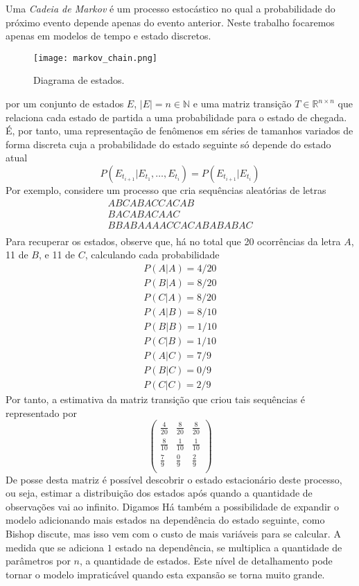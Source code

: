 \documentclass{subfiles}
\begin{document}
Uma \textit{Cadeia de Markov} é um processo estocástico no qual a probabilidade do próximo evento depende apenas do evento anterior. Neste trabalho focaremos apenas em modelos de tempo e estado discretos.

\begin{figure} %
	\texttt{[image: markov\_chain.png]}
	\caption{Diagrama de estados.}
	\label{fig:tcanther}
\end{figure}

por um conjunto de estados $E$, $\vert E \vert = n \in \mathbb{N}$ e uma matriz transição $T \in \mathbb{R}^{n \times n}$ que relaciona cada estado de partida a uma probabilidade para o estado de chegada. É, por tanto, uma representação de fenômenos em séries de tamanhos variados de forma discreta cuja a probabilidade do estado seguinte só depende do estado atual
\[
	P(E_{t_{i+1}} \vert E_{t_1}, \dots, E_{t_i}) = P(E_{t_{i+1}} \vert E_{t_i})
\]
Por exemplo, considere um processo que cria sequências aleatórias de letras
\begin{gather*}
	ABCABACCACAB         \\
	BACABACAAC           \\
	BBABAAAACCACABABABAC \\
\end{gather*}
Para recuperar os estados, observe que, há no total que 20 ocorrências da letra $A$, 11 de $B$, e 11 de $C$, calculando cada probabilidade
\begin{gather*}
	P(A|A) = 4/20 \\
	P(B|A) = 8/20 \\
	P(C|A) = 8/20 \\
	P(A|B) = 8/10 \\
	P(B|B) = 1/10 \\
	P(C|B) = 1/10 \\
	P(A|C) = 7/9  \\
	P(B|C) = 0/9  \\
	P(C|C) = 2/9
\end{gather*}
Por tanto, a estimativa da matriz transição que criou tais sequências é representado por
\[
	\begin{pmatrix}
		\frac{4}{20} & \frac{8}{20} & \frac{8}{20} \\
		\frac{8}{10} & \frac{1}{10} & \frac{1}{10} \\
		\frac{7}{9} & \frac{0}{9} & \frac{2}{9} \\
	\end{pmatrix}
\]
De posse desta matriz é possível descobrir o estado estacionário deste processo, ou seja, estimar a distribuição dos estados após quando a quantidade de observações vai ao infinito. Digamos 
Há também a possibilidade de expandir o modelo adicionando mais estados na dependência do estado seguinte, como Bishop\autocite{Bishop:2006pat} discute, mas isso vem com o custo de mais variáveis para se calcular. A medida que se adiciona $1$ estado na dependência, se multiplica a quantidade de parâmetros por $n$, a quantidade de estados. Este nível de detalhamento pode tornar o modelo impraticável quando esta expansão se torna muito grande.
\end{document}
